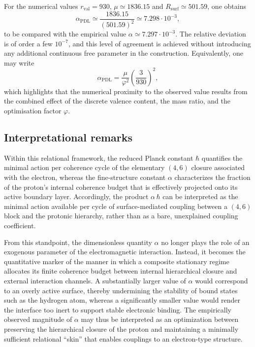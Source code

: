 \documentclass[12pt,a4paper]{article}
\begin{document}
For the numerical values \(r_{\text{val}}=930\), \(\mu\simeq 1836.15\) and \(R_{\text{surf}}\simeq 501.59\), one obtains
\[
  \alpha_{\text{PDL}}
  \simeq
  \frac{1836.15}{(501.59)^2}
  \simeq 7.298 \cdot 10^{-3},
\]
to be compared with the empirical value \(\alpha \simeq 7.297 \cdot 10^{-3}\).
The relative deviation is of order a few \(10^{-7}\), and this level of agreement is achieved without introducing any additional continuous free parameter in the construction.\cite{Laubscher2026PDL_English,Laubscher2026LDP_French}
Equivalently, one may write
\[
  \alpha_{\text{PDL}}
  =
  \frac{\mu}{\varphi^2}
  \left(\frac{3}{930}\right)^2,
\]
which highlights that the numerical proximity to the observed value results from the combined effect of the discrete valence content, the mass ratio, and the optimisation factor \(\varphi\).

\subsection{Interpretational remarks}

Within this relational framework, the reduced Planck constant \(\hbar\) quantifies the minimal action per coherence cycle of the elementary \((4,6)\) closure associated with the electron, whereas the fine-structure constant \(\alpha\) characterizes the fraction of the proton’s internal coherence budget that is effectively projected onto its active boundary layer.
Accordingly, the product \(\alpha\,\hbar\) can be interpreted as the minimal action available per cycle of surface-mediated coupling between a \((4,6)\) block and the protonic hierarchy, rather than as a bare, unexplained coupling coefficient.\cite{Laubscher2026PDL_English,Laubscher2026LDP_French}

From this standpoint, the dimensionless quantity \(\alpha\) no longer plays the role of an exogenous parameter of the electromagnetic interaction.
Instead, it becomes the quantitative marker of the manner in which a composite stationary regime allocates its finite coherence budget between internal hierarchical closure and external interaction channels.
A substantially larger value of \(\alpha\) would correspond to an overly active surface, thereby undermining the stability of bound states such as the hydrogen atom, whereas a significantly smaller value would render the interface too inert to support stable electronic binding.
The empirically observed magnitude of \(\alpha\) may thus be interpreted as an optimization between preserving the hierarchical closure of the proton and maintaining a minimally sufficient relational “skin” that enables couplings to an electron-type structure.
\end{document}

